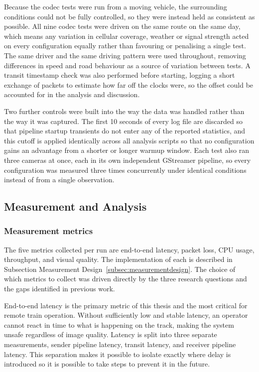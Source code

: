 Because the codec tests were run from a moving vehicle, the surrounding conditions could not be fully controlled, so they were instead held as consistent as possible. All nine codec tests were driven on the same route on the same day, which means any variation in cellular coverage, weather or signal strength acted on every configuration equally rather than favouring or penalising a single test. The same driver and the same driving pattern were used throughout, removing differences in speed and road behaviour as a source of variation between tests. A transit timestamp check was also performed before starting, logging a short exchange of packets to estimate how far off the clocks were, so the offset could be accounted for in the analysis and discussion.

Two further controls were built into the way the data was handled rather than the way it was captured. The first 10 seconds of every log file are discarded so that pipeline startup transients do not enter any of the reported statistics, and this cutoff is applied identically across all analysis scripts so that no configuration gains an advantage from a shorter or longer warmup window. Each test also ran three cameras at once, each in its own independent GStreamer pipeline, so every configuration was measured three times concurrently under identical conditions instead of from a single observation.

\vspace{5mm}
\subsection{Measurement and Analysis}

\subsubsection{Measurement metrics}
The five metrics collected per run are end-to-end latency, packet loss, CPU usage, throughput, and visual quality. The implementation of each is described in Subsection Measurement Design~\ref{subsec:measurementdesign}. The choice of which metrics to collect was driven directly by the three research questions and the gaps identified in previous work.

End-to-end latency is the primary metric of this thesis and the most critical for remote train operation. Without sufficiently low and stable latency, an operator cannot react in time to what is happening on the track, making the system unsafe regardless of image quality. Latency is split into three separate measurements, sender pipeline latency, transit latency, and receiver pipeline latency. This separation makes it possible to isolate exactly where delay is introduced so it is possible to take steps to prevent it in the future.

